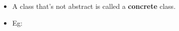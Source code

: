 \setlength{\columnsep}{3pt}
\begin{flushleft}
	
	\begin{itemize}
		\item A class that’s not abstract is called a \textbf{concrete} class. 
		\item Eg:
		\bigskip
		
	\end{itemize}

\end{flushleft}

\newpage


